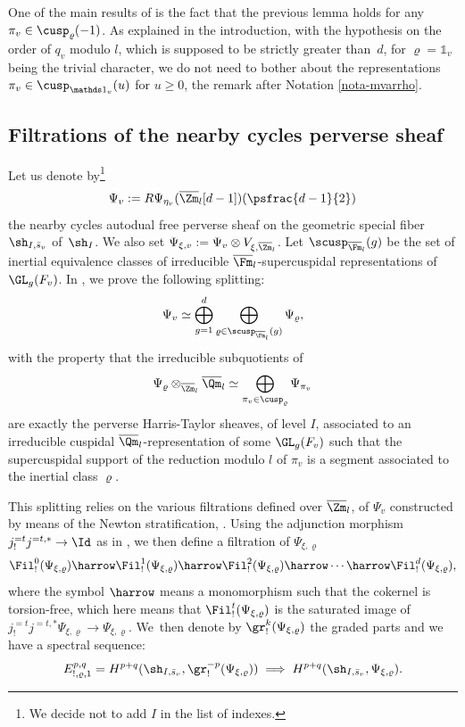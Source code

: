 \begin{remark}
One of the main results of \cite[Prop.\,2.4.1]{boyer-duke} is the fact that
the previous lemma holds for any $\pi_v \in \cusp_\varrho(-1)$.
As explained in the introduction, with the hypothesis on the order of $q_v$ modulo $l$,
which is supposed to be strictly greater than~$d$, for $\varrho=\mathds 1_v$ being the trivial character,
we do not need to bother about the representations
$\pi_v \in \cusp_{\mathds 1_v}(u)$ for $u \geq 0$,
\cf the remark after Notation \ref{nota-mvarrho}.
\end{remark}

\subsection{Filtrations of the nearby cycles perverse sheaf}
\label{para-fil-psi}

Let us denote by\footnote{We decide not to add $I$ in the list of indexes.}
\[
\Psi_{v}:=R\Psi_{\eta_v}(\overline \Zm_l[d-1])(\psfrac{d-1}{2})
\]
the nearby cycles autodual free perverse sheaf on the geometric special fiber $\sh_{I,\bar s_v}$
of~$\sh_I$. We also set $\Psi_{\xi,v}:=\Psi_{v} \otimes V_{\xi,\overline \Zm_l}$.
Let $\scusp_{\overline \Fm_l}(g)$ be the set of inertial equivalence
classes of irreducible $\overline \Fm_l$-supercuspidal representations of
$\GL_g(F_v)$. In \cite[Prop.\,3.3.4]{boyer-local-ihara}, we prove the following splitting:
\begin{equation} \label{eq-psi-dec}
\Psi_{v} \simeq \bigoplus_{g=1}^d
\bigoplus_{\varrho \in \scusp_{\overline \Fm_l}(g)} \Psi_{\varrho},
\end{equation}
with the property that the irreducible subquotients of
\[
\Psi_{\varrho} \otimes_{\overline \Zm_l} \overline \Qm_l \simeq
\bigoplus_{\pi_v \in \cusp_\varrho} \Psi_{\pi_v}
\]
are exactly the perverse Harris-Taylor sheaves, of level $I$,
associated to an irreducible cuspidal $\overline \Qm_l$-representation
of some $\GL_g(F_v)$ such that the supercuspidal support of the reduction modulo $l$ of
$\pi_v$ is a segment associated to the inertial class $\varrho$.

This splitting relies on the various filtrations defined over $\overline \Zm_l$,
of $\Psi_v$ constructed by means of the Newton stratification, \cf \cite{boyer-FT}.
Using the
adjunction morphism \hbox{$j^{=t}_! j^{=t,*}\to\Id$} as in \cite{boyer-torsion}, we then define
a filtration of $\Psi_{\xi,\varrho}$
\[
\Fil^0_!(\Psi_{\xi,\varrho}) \harrow \Fil^1_!(\Psi_{\xi,\varrho}) \harrow
\Fil^{2}_!(\Psi_{\xi,\varrho})
\harrow \cdots \harrow \Fil^{d}_!(\Psi_{\xi,\varrho}),
\]
where the symbol $\harrow$ means a monomorphism such that the cokernel
is torsion-free, which here means that
$\Fil^{t}_!(\Psi_{\xi,\varrho})$ is the saturated image of
$j^{=t}_!j^{=t,*} \Psi_{\xi,\varrho} \to \Psi_{\xi,\varrho}$.
We~then denote by $\gr^k_!(\Psi_{\xi,\varrho})$ the graded parts and we have a spectral sequence:
\begin{equation} \label{eq-ss2}
E_{!,\varrho,1}^{p,q}=H^{p+q}(\sh_{I,\bar s_v},\gr^{-p}_!(\Psi_{\xi,\varrho})) \implies
H^{p+q}(\sh_{I,\bar s_v},\Psi_{\xi,\varrho}).
\end{equation}

